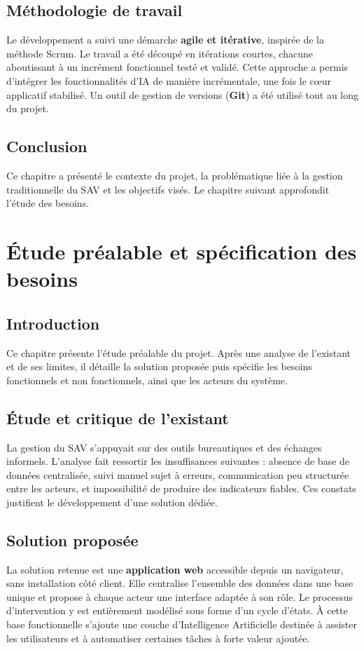 \section{Méthodologie de travail}
Le développement a suivi une démarche \textbf{agile et itérative}, inspirée de la méthode Scrum. Le travail a été découpé en itérations courtes, chacune aboutissant à un incrément fonctionnel testé et validé. Cette approche a permis d'intégrer les fonctionnalités d'IA de manière incrémentale, une fois le cœur applicatif stabilisé. Un outil de gestion de versions (\textbf{Git}) a été utilisé tout au long du projet.

\section{Conclusion}
Ce chapitre a présenté le contexte du projet, la problématique liée à la gestion traditionnelle du SAV et les objectifs visés. Le chapitre suivant approfondit l'étude des besoins.


\chapter{Étude préalable et spécification des besoins}

\section{Introduction}
Ce chapitre présente l'étude préalable du projet. Après une analyse de l'existant et de ses limites, il détaille la solution proposée puis spécifie les besoins fonctionnels et non fonctionnels, ainsi que les acteurs du système.

\section{Étude et critique de l'existant}
La gestion du SAV s'appuyait sur des outils bureautiques et des échanges informels. L'analyse fait ressortir les insuffisances suivantes : absence de base de données centralisée, suivi manuel sujet à erreurs, communication peu structurée entre les acteurs, et impossibilité de produire des indicateurs fiables. Ces constats justifient le développement d'une solution dédiée.

\section{Solution proposée}
La solution retenue est une \textbf{application web} accessible depuis un navigateur, sans installation côté client. Elle centralise l'ensemble des données dans une base unique et propose à chaque acteur une interface adaptée à son rôle. Le processus d'intervention y est entièrement modélisé sous forme d'un cycle d'états. À cette base fonctionnelle s'ajoute une couche d'Intelligence Artificielle destinée à assister les utilisateurs et à automatiser certaines tâches à forte valeur ajoutée.

